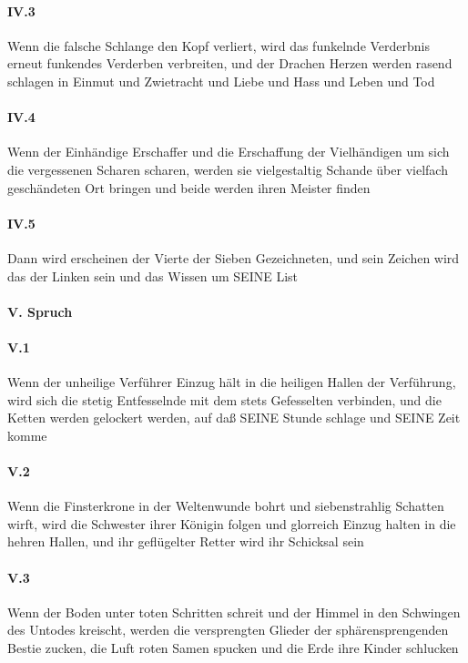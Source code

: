 \paragraph{IV.3} Wenn die falsche Schlange den Kopf verliert, wird das funkelnde Verderbnis erneut funkendes Verderben verbreiten, und der Drachen Herzen werden rasend schlagen in Einmut und Zwietracht und Liebe und Hass und Leben und Tod

\paragraph{IV.4} Wenn der Einhändige Erschaffer und die Erschaffung der Vielhändigen um sich die vergessenen Scharen scharen, werden sie vielgestaltig Schande über vielfach geschändeten Ort bringen und beide werden ihren Meister finden

\paragraph{IV.5} Dann wird erscheinen der Vierte der Sieben Gezeichneten, und sein Zeichen wird das der Linken sein und das Wissen um SEINE List

\paragraph{V. Spruch}

\paragraph{V.1} Wenn der unheilige Verführer Einzug hält in die heiligen Hallen der Verführung, wird sich die stetig Entfesselnde mit dem stets Gefesselten verbinden, und die Ketten werden gelockert werden, auf daß SEINE Stunde schlage und SEINE Zeit komme

\paragraph{V.2} Wenn die Finsterkrone in der Weltenwunde bohrt und siebenstrahlig Schatten wirft, wird die Schwester ihrer Königin folgen und glorreich Einzug halten in die hehren Hallen, und ihr geflügelter Retter wird ihr Schicksal sein

\paragraph{V.3} Wenn der Boden unter toten Schritten schreit und der Himmel in den Schwingen des Untodes kreischt, werden die versprengten Glieder der sphärensprengenden Bestie zucken, die Luft roten Samen spucken und die Erde ihre Kinder schlucken


